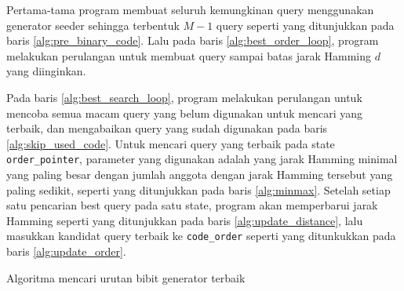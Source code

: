 Pertama-tama program membuat seluruh kemungkinan query menggunakan generator seeder sehingga terbentuk $M-1$ query seperti yang ditunjukkan pada baris \ref{alg:pre_binary_code}. Lalu pada baris \ref{alg:best_order_loop}, program melakukan perulangan untuk membuat query sampai batas jarak Hamming $d$ yang diinginkan. 

Pada baris \ref{alg:best_search_loop}, program melakukan perulangan untuk mencoba semua macam query yang belum digunakan untuk mencari yang terbaik, dan mengabaikan query yang sudah digunakan pada baris \ref{alg:skip_used_code}. Untuk mencari query yang terbaik pada state \texttt{order\_pointer}, parameter yang digunakan adalah yang jarak Hamming minimal yang paling besar dengan jumlah anggota dengan jarak Hamming tersebut yang paling sedikit, seperti yang ditunjukkan pada baris \ref{alg:minmax}. Setelah setiap satu pencarian best query pada satu state, program akan memperbarui jarak Hamming seperti yang ditunjukkan pada baris \ref{alg:update_distance}, lalu masukkan kandidat query terbaik ke \texttt{code\_order} seperti yang ditunkukkan pada baris \ref{alg:update_order}.

\begin{algorithm}[h]
\caption{Algoritma mencari urutan bibit generator terbaik}
\label{alg:exhaustive_search}
\end{algorithm}

